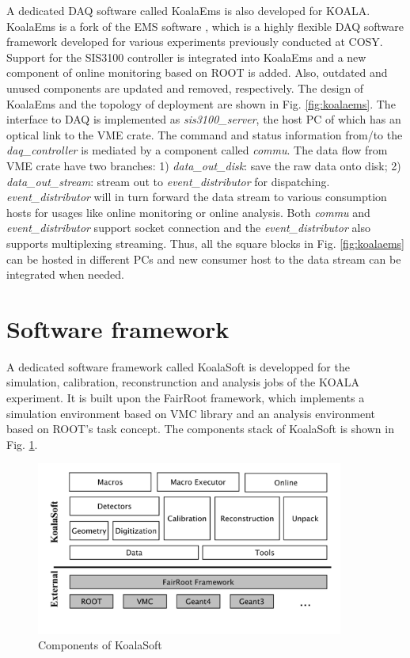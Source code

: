 \documentclass[number]{elsarticle}
\begin{document}
A dedicated DAQ software called KoalaEms is also developed for KOALA.
KoalaEms is a fork of the EMS software \cite{ems}, which is a highly flexible DAQ software framework developed for various experiments previously conducted at COSY.
Support for the SIS3100 controller is integrated into KoalaEms and a new component of online monitoring based on ROOT is added.
Also, outdated and unused components are updated and removed, respectively.
The design of KoalaEms and the topology of deployment are shown in Fig. \ref{fig:koalaems}.
The interface to DAQ is implemented as \emph{sis3100\_server}, the host PC of which has an optical link to the VME crate.
The command and status information from/to the \emph{daq\_controller} is mediated by a component called \emph{commu}.
The data flow from VME crate have two branches: 1) \emph{data\_out\_disk}: save the raw data onto disk; 2) \emph{data\_out\_stream}: stream out to \emph{event\_distributor} for dispatching.
\emph{event\_distributor} will in turn forward the data stream to various consumption hosts for usages like online monitoring or online analysis.
Both \emph{commu} and \emph{event\_distributor} support socket connection and the \emph{event\_distributor} also supports multiplexing streaming.
Thus, all the square blocks in Fig. \ref{fig:koalaems} can be hosted in different PCs and new consumer host to the data stream can be integrated when needed.


\section{Software framework}
\label{sec:software}

A dedicated software framework called KoalaSoft is developped for the simulation, calibration, reconstrunction and analysis jobs of the KOALA experiment.
It is built upon the FairRoot \cite{fairroot} framework, which implements a simulation environment based on VMC \cite{vmc} library and an analysis environment based on ROOT's task concept.
The components stack of KoalaSoft is shown in Fig. \ref{fig:koalasoft}.

\begin{figure}[htbp]
\centering
\includegraphics[width=0.9\textwidth]{./koalasoft_components.png}
\caption{Components of KoalaSoft}
\label{fig:koalasoft}
\end{figure}
\end{document}
